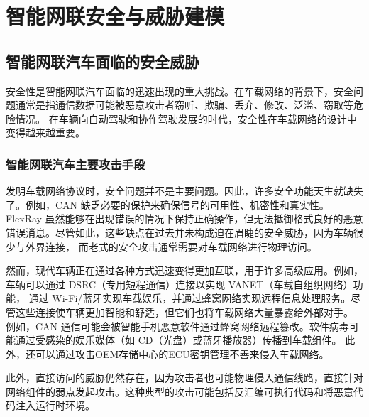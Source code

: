 \chapter{智能网联安全与威胁建模}
\label{ch3}

\section{智能网联汽车面临的安全威胁}
安全性是智能网联汽车面临的迅速出现的重大挑战。在车载网络的背景下，安全问题通常是指通信数据可能被恶意攻击者窃听、欺骗、丢弃、修改、泛滥、窃取等危险情况。
在车辆向自动驾驶和协作驾驶发展的时代，安全性在车载网络的设计中变得越来越重要。
\subsection{智能网联汽车主要攻击手段}
发明车载网络协议时，安全问题并不是主要问题。因此，许多安全功能天生就缺失了。例如，CAN 缺乏必要的保护来确保信号的可用性、机密性和真实性\cite{woo2014practical}。
FlexRay 虽然能够在出现错误的情况下保持正确操作，但无法抵御格式良好的恶意错误消息\cite{kleberger2011security}。尽管如此，这些缺点在过去并未构成迫在眉睫的安全威胁，因为车辆很少与外界连接，
而老式的安全攻击通常需要对车载网络进行物理访问。

然而，现代车辆正在通过各种方式迅速变得更加互联，用于许多高级应用。例如，车辆可以通过 DSRC（专用短程通信）连接以实现 VANET（车载自组织网络）功能，
通过 Wi-Fi/蓝牙实现车载娱乐，并通过蜂窝网络实现远程信息处理服务。尽管这些连接使车辆更加智能和舒适，但它们也将车载网络大量暴露给外部对手。
例如，CAN 通信可能会被智能手机恶意软件通过蜂窝网络远程篡改\cite{woo2014practical}。软件病毒可能通过受感染的娱乐媒体（如 CD（光盘）或蓝牙播放器）传播到车载组件。
此外，还可以通过攻击OEM存储中心的ECU密钥管理不善来侵入车载网络。

此外，直接访问的威胁仍然存在，因为攻击者也可能物理侵入通信线路，直接针对网络组件的弱点发起攻击。这种典型的攻击可能包括反汇编可执行代码和将恶意代码注入运行时环境。

